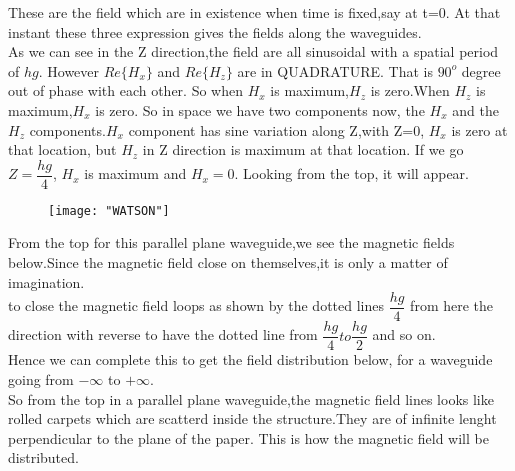  These are the field which are in existence when time is fixed,say at t=0. At that instant these three expression gives the fields along the waveguides.\\
 As we can see in the Z direction,the field are all sinusoidal with a spatial period of ${hg}$. However ${Re\{H_x\}}$ and ${Re\{H_z\}}$ are in QUADRATURE. That is ${90^{o}}$ degree out of phase with each other. So when ${H_x}$ is maximum,${H_z}$ is zero.When ${H_z}$ is maximum,${H_x}$ is zero. So in space we have two components now, the ${H_x}$ and the ${H_z}$ components.${H_x}$ component has sine variation along Z,with Z=0, ${H_x}$ is zero at that location, but ${H_z}$ in Z direction is maximum at that location. If we go ${Z=\dfrac{hg}{4}}$, ${H_x}$ is maximum and ${H_x=0}$. Looking from the top, it will appear.\\
 \begin{figure}[h]
 	\centering
 	\vspace{-100pt}
 	\texttt{[image: "WATSON"]}
 	\caption{}
 \end{figure}
 From the top for this parallel plane waveguide,we see the magnetic fields below.Since the magnetic field close on themselves,it is only a matter of imagination. \\
 to close the magnetic field loops as shown by the dotted lines ${\dfrac{hg}{4}}$ from here the direction with reverse to have the dotted line from ${\dfrac{hg}{4}  to     \dfrac{hg}{2}}$ and so on. \\
 Hence we can complete this to get the field distribution below, for a waveguide going from ${-\infty}$ to ${+\infty}$.\\
 So from the top in a parallel plane waveguide,the magnetic field lines looks like rolled carpets which are scatterd inside the structure.They are of infinite lenght perpendicular to the plane of the paper. This is how the magnetic field will be distributed.
